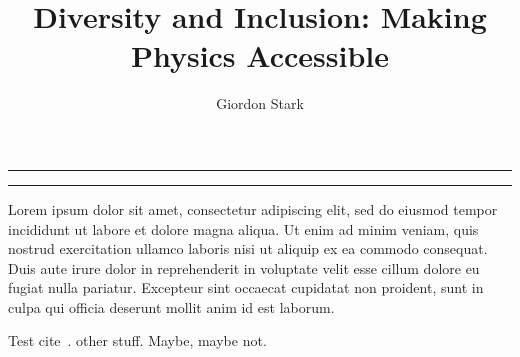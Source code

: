 \documentclass{article}
\title{Diversity and Inclusion: Making Physics Accessible}
\author[a]{Giordon Stark}
\affil[a]{SCIPP, UC Santa Cruz}
\date{}
\begin{document}
  \maketitle
  \hrule
  \vspace{0.5em}
  \hrule
  \vspace{2.5em}
  Lorem ipsum dolor sit amet, consectetur adipiscing elit, sed do eiusmod tempor incididunt ut labore et dolore magna aliqua. Ut enim ad minim veniam, quis nostrud exercitation ullamco laboris nisi ut aliquip ex ea commodo consequat. Duis aute irure dolor in reprehenderit in voluptate velit esse cillum dolore eu fugiat nulla pariatur. Excepteur sint occaecat cupidatat non proident, sunt in culpa qui officia deserunt mollit anim id est laborum.

  Test cite~\cite{AudioAccessibility, TheAtlantic, DCMP, ReelWords, A11yNYC, Wired, AngryDeafPeople}.
  other stuff. Maybe, maybe not.
  \printbibliography
\end{document}
